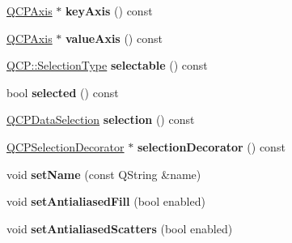 \begin{DoxyCompactItemize}
\item 
\hyperlink{class_q_c_p_axis}{Q\+C\+P\+Axis} $\ast$ {\bfseries key\+Axis} () const \hypertarget{class_q_c_p_abstract_plottable_a72c7a09c22963f2c943f07112b311103}{}\label{class_q_c_p_abstract_plottable_a72c7a09c22963f2c943f07112b311103}

\item 
\hyperlink{class_q_c_p_axis}{Q\+C\+P\+Axis} $\ast$ {\bfseries value\+Axis} () const \hypertarget{class_q_c_p_abstract_plottable_a3106f9d34d330a6097a8ec5905e5b519}{}\label{class_q_c_p_abstract_plottable_a3106f9d34d330a6097a8ec5905e5b519}

\item 
\hyperlink{namespace_q_c_p_ac6cb9db26a564b27feda362a438db038}{Q\+C\+P\+::\+Selection\+Type} {\bfseries selectable} () const \hypertarget{class_q_c_p_abstract_plottable_a9369b0da736b88dea0ee6b7345f8ea74}{}\label{class_q_c_p_abstract_plottable_a9369b0da736b88dea0ee6b7345f8ea74}

\item 
bool {\bfseries selected} () const \hypertarget{class_q_c_p_abstract_plottable_ab901903adcb0e29467d63de72340ab29}{}\label{class_q_c_p_abstract_plottable_ab901903adcb0e29467d63de72340ab29}

\item 
\hyperlink{class_q_c_p_data_selection}{Q\+C\+P\+Data\+Selection} {\bfseries selection} () const \hypertarget{class_q_c_p_abstract_plottable_a6fcea502826afbaab2568bd3ebc61b4b}{}\label{class_q_c_p_abstract_plottable_a6fcea502826afbaab2568bd3ebc61b4b}

\item 
\hyperlink{class_q_c_p_selection_decorator}{Q\+C\+P\+Selection\+Decorator} $\ast$ {\bfseries selection\+Decorator} () const \hypertarget{class_q_c_p_abstract_plottable_a211f41674a29360a0788cc3c9a7efc85}{}\label{class_q_c_p_abstract_plottable_a211f41674a29360a0788cc3c9a7efc85}

\item 
void {\bfseries set\+Name} (const Q\+String \&name)\hypertarget{class_q_c_p_abstract_plottable_ab79c7ba76bc7fa89a4b3580e12149f1f}{}\label{class_q_c_p_abstract_plottable_ab79c7ba76bc7fa89a4b3580e12149f1f}

\item 
void {\bfseries set\+Antialiased\+Fill} (bool enabled)\hypertarget{class_q_c_p_abstract_plottable_a089d6b5577120239b55c39ed27c39536}{}\label{class_q_c_p_abstract_plottable_a089d6b5577120239b55c39ed27c39536}

\item 
void {\bfseries set\+Antialiased\+Scatters} (bool enabled)\hypertarget{class_q_c_p_abstract_plottable_a2f03f067ede2ed4da6f7d0e4777a3f02}{}\label{class_q_c_p_abstract_plottable_a2f03f067ede2ed4da6f7d0e4777a3f02}


\end{DoxyCompactItemize}
